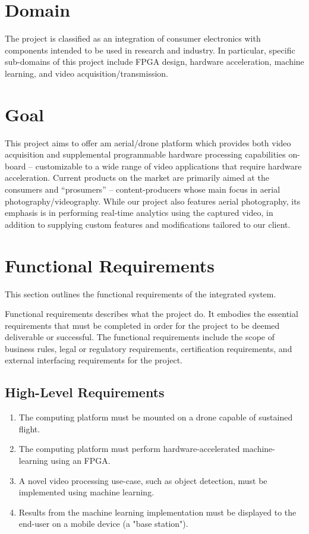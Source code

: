 \documentclass[10pt,letterpaper]{article}
\begin{document}
\section{Domain}

The project is classified as an integration of consumer electronics with components intended to be used in research and industry. In particular, specific sub-domains of this project include FPGA design, hardware acceleration, machine learning, and video acquisition/transmission. 

\section{Goal}

This project aims to offer am aerial/drone platform which provides both video acquisition and supplemental programmable hardware processing capabilities on-board -- customizable to a wide range of video applications that require hardware acceleration. Current products on the market are primarily aimed at the consumers and ``prosumers'' -- content-producers whose main focus in aerial photography/videography. While our project also features aerial photography, its emphasis is in performing real-time analytics using the captured video, in addition to supplying custom features and modifications tailored to our client.

\section{Functional Requirements}\label{section:funcreq}

This section outlines the functional requirements of the integrated system.

Functional requirements describes what the project do. It embodies the essential requirements that must be completed in order for the project to be deemed deliverable or successful. The functional requirements include the scope of business rules, legal or regulatory requirements, certification requirements, and external interfacing requirements for the project.

\subsection{High-Level Requirements}
\begin{enumerate}[label=F.HL.\arabic*, wide=1cm, widest=3cm, leftmargin=*, font=\bfseries, noitemsep,topsep=0pt, parsep=4pt, partopsep=0pt]
    \item The computing platform must be mounted on a drone capable of sustained flight.
    \item The computing platform must perform hardware-accelerated machine-learning using an FPGA.
    \item A novel video processing use-case, such as object detection, must be implemented using machine learning.
    \item Results from the machine learning implementation must be displayed to the end-user on a mobile device (a "base station").
\end{enumerate}
\end{document}
